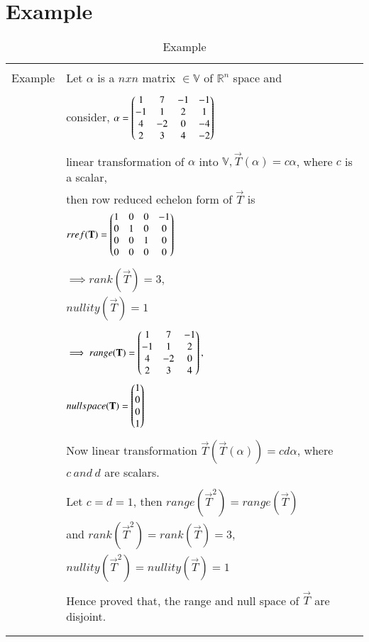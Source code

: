 \documentclass[journal,12pt]{IEEEtran}
\begin{document}
\section{\textbf{Example}}
\renewcommand{\thetable}{2}
\begin{longtable}{|l|l|}
\hline
\multirow{3}{*}{Example} & \\
& Let $\alpha$ is a $nxn$ matrix $ \in \mathbb{V}$ of $\mathbb{R}^n$ space and\\
& \\
& consider, $\alpha = \begin{pmatrix}1&7&-1&-1\\-1&1&2&1\\4&-2&0&-4\\2&3&4&-2\end{pmatrix}$\\
& \\
& linear transformation of $\alpha$ into $\mathbb{V}, \vec{T}(\alpha) = c\alpha$, where $c$ is a scalar,\\
& then row reduced echelon form of $\vec{T}$ is\\
& $rref(\mathbf{T}) = \begin{pmatrix}1&0&0&-1\\0&1&0&0\\0&0&1&0\\0&0&0&0\end{pmatrix}$\\
& \\
& $\implies rank(\vec{T}) = 3,$\\
& $nullity(\vec{T}) = 1$\\
& \\
& $\implies range(\mathbf{T}) = \begin{pmatrix}1&7&-1\\-1&1&2\\4&-2&0\\2&3&4\end{pmatrix},$\\
& $null space(\mathbf{T}) = \begin{pmatrix}1\\0\\0\\1\end{pmatrix}$\\
& \\
& Now linear transformation $\vec{T}(\vec{T}(\alpha)) = cd\alpha$, where $c \  and \  d$ are scalars.\\
& \\
& Let $ c = d = 1$, then $range(\vec{T}^2) = range (\vec{T})$\\
& and $rank (\vec{T}^2) = rank (\vec{T}) = 3$,\\
& $nullity (\vec{T}^2) = nullity (\vec{T}) = 1$\\
& \\
& Hence proved that, the range and null space of $\vec{T}$ are disjoint.\\
& \\
\hline
\caption{Example}
\label{table:2}
\end{longtable}
\end{document}
